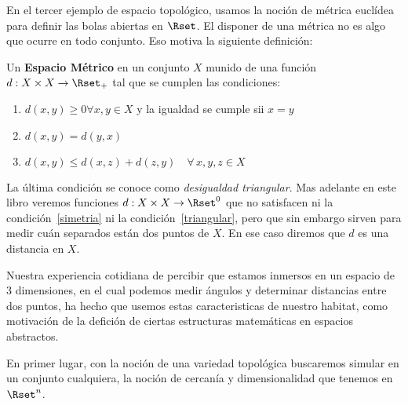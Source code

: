

En el  tercer ejemplo de espacio  topol\'ogico, usamos la  noci\'on de m\'etrica
eucl\'idea  para definir  las  bolas abiertas  en  $\Rset$. El  disponer de  una
m\'etrica  no es  algo que  ocurre  en todo  conjunto. Eso  motiva la  siguiente
definici\'on:
%
\begin{definicion}
  Un {\bf  Espacio M\'etrico} en un conjunto  $X$ munido de una  funci\'on $d: X
  \times X \rightarrow \Rset_+$ tal que se cumplen las condiciones:
  \begin{enumerate}
  \item\label{positiva} $d(x,y)  \geq 0 \forall  x , y  \in X$ y la  igualdad se
    cumple sii $x=y$
  \item\label{simetria} $d(x,y) = d(y,x)$
  \item\label{triangular} $d(x,y) \leq d(x,z) + d(z,y)  \quad \forall \, x , y ,
    z \in X$
  \end{enumerate}
\end{definicion}
%
La  \'ultima  condici\'on se  conoce  como  {\it  desigualdad triangular}.   Mas
adelante en este libro veremos funciones $d: X \times X \rightarrow \Rset^0$ que
no      satisfacen     ni      la      condici\'on~\ref{simetria}     ni      la
condici\'on~\ref{triangular},  pero que  sin  embargo sirven  para medir  cu\'an
separados  est\'an dos  puntos  de $X$.   En ese  caso  diremos que  $d$ es  una
distancia en $X$.




Nuestra experiencia cotidiana de percibir  que estamos inmersos en un espacio de
3 dimensiones, en el cual  podemos medir \'angulos y determinar distancias entre
dos puntos, ha  hecho que usemos estas caracteristicas  de nuestro habitat, como
motivaci\'on de  la defici\'on de ciertas estructuras  matem\'aticas en espacios
abstractos.

En primer lugar, con la noci\'on de una variedad topol\'ogica buscaremos simular
en  un conjunto  cualquiera, la  noci\'on  de cercan\'ia  y dimensionalidad  que
tenemos en $\Rset^n$.

